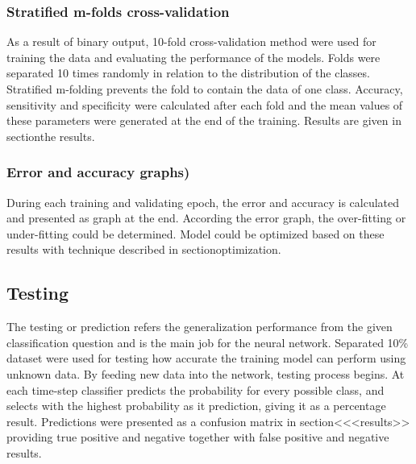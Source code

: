 \subsubsection{Stratified m-folds cross-validation}
As a result of binary output, 10-fold cross-validation method were used for training the data and evaluating the performance of the models. Folds were separated 10 times randomly in relation to the distribution of the classes. Stratified m-folding prevents the fold to contain the data of one class. Accuracy, sensitivity and specificity were calculated after each fold and the mean values of these parameters were generated at the end of the training. Results are given in section{the results}.

\subsubsection{Error and accuracy graphs)}
During each training and validating epoch, the error and accuracy is calculated and presented as graph at the end. According the error graph, the over-fitting or under-fitting could be determined. Model could be optimized based on these results with technique described in section{optimization}.

\subsection{Testing}
The testing or prediction refers the generalization performance from the given classification question and is the main job for the neural network.
Separated 10\% dataset were used for testing how accurate the training model can perform using unknown data. By feeding new data into the network, testing process begins. At each time-step classifier predicts the probability for every possible class, and selects with the highest probability as it prediction, giving it as a percentage result. Predictions were presented as a confusion matrix in section<<<results>> providing true positive and negative together with false positive and negative results.
